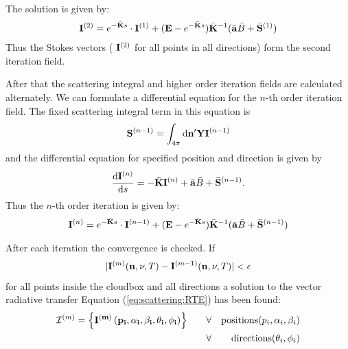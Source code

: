 The solution is given by:
\begin{eqnarray}
   {\bf I}^{(2)} = e^{-\bar{{\bf K}} s}\cdot{\bf I}^{(1)} + ({\bf E} - e^{-\bar{{\bf K}}
    s}) \bar{{\bf K}}^{-1} (\bar{{\bf a}} \bar{B} + \bar{{\bf S}}^{(1)})
\end{eqnarray}
Thus the Stokes vectors ( ${\bf I}^{(2)}$ for all points in all
directions) form the second iteration field.

After that the scattering integral and higher order iteration fields
are calculated alternately. We can formulate a differential equation
for the $n$-th order iteration field. The fixed scattering integral
term in this equation is
 \begin{eqnarray}
  {\bf S}^{(n-1)} = \int_{4\pi} \mathrm{d} {\bf n}^\prime
  {\bf Y} {\bf I}^{(n-1)}
\end{eqnarray}
and the differential equation for specified position and direction is
given by
\begin{eqnarray}
     \frac{\mathrm{d} {\bf I}^{(n)}}{\mathrm{d} s} =
     -\bar{{\bf K}} {\bf I}^{(n)} + \bar{{\bf a}} \bar{B}
     +\bar{{\bf S}}^{(n-1)}.
\end{eqnarray} 
Thus the $n$-th order iteration is given by:
\begin{eqnarray}
   {\bf I}^{(n)} = e^{-\bar{{\bf K}} s}\cdot{\bf I}^{(n-1)} + ({\bf E} - e^{-\bar{{\bf K}}
    s}) \bar{{\bf K}}^{-1} (\bar{{\bf a}} \bar{B} + \bar{{\bf S}}^{(n-1)})
\end{eqnarray}



After each iteration the convergence is checked. If
\begin{eqnarray}
|{\bf I}^{(m)} ({\bf n}, \nu, T) -  {\bf I}^{(m-1)} ({\bf n}, \nu, T)| < {\bf \epsilon}
\end{eqnarray}
for all points inside the cloudbox and all directions a solution to
the vector radiative transfer Equation (\ref{eq:scattering:RTE}) has
been found:
\begin{eqnarray}
{\mathcal I}^{(m)} = \left\{ \bf{I}^{(m)} \left( p_i, \alpha_i, \beta_i, \theta_i, \phi_i\right)\right\}  \qquad  
&\forall& {\rm positions } (p_i,\alpha_i, \beta_i)\\
&\forall& {\rm directions } (\theta_i,\phi_i)
\end{eqnarray}



